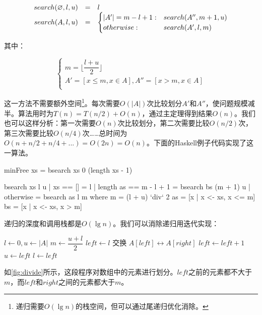 \documentclass[b5paper]{ctexart}
\begin{document}
\[
\begin{array}{rcl}
search(\varnothing, l, u) & = & l \\
search(A, l, u) & = & \begin{cases}
       |A'| = m - l + 1 : & search(A'', m+1, u) \\
       otherwise : & search(A',  l, m) \\
\end{cases}
\end{array}
\]

其中：

\[
\begin{cases}
m = \lfloor \dfrac{l + u}{2} \rfloor \\
A' = [x \leq m, x \in A], A'' = [x > m, x \in A] \\
\end{cases}
\]

这一方法不需要额外空间\footnote{递归需要$O(\lg n)$的栈空间，但可以通过尾递归优化消除。}。每次需要$O(|A|)$次比较划分$A'$和$A''$，使问题规模减半。算法用时为$T(n) = T(n/2) + O(n)$，通过主定理得到结果$O(n)$。我们也可以这样分析：第一次需要$O(n)$次比较划分，第二次需要比较$O(n/2)$次，第三次需要比较$O(n/4)$次……总时间为$O(n + n/2 + n/4 + ...) = O(2n) = O(n)$。下面的Haskell例子代码实现了这一算法。

\lstset{frame = single}
\begin{Haskell}
minFree xs = bsearch xs 0 (length xs - 1)

bsearch xs l u | xs == [] = l
               | length as == m - l + 1 = bsearch bs (m + 1) u
               | otherwise = bsearch as l m
    where
      m = (l + u) `div` 2
      as = [x | x <- xs, x <= m]
      bs = [x | x <- xs, x > m]
\end{Haskell}

递归的深度和调用栈都是$O(\lg n)$。我们可以消除递归用迭代实现：

\begin{algorithmic}[1]
  \State $l \gets 0, u \gets |A|$
    \State $m \gets \dfrac{u + l}{2}$
    \State $left \gets l$
        \State 交换 $A[left] \leftrightarrow A[right]$
        \State $left \gets left + 1$
      \EndIf
    \EndFor
      \State $u \gets left$
    \Else
      \State $l \gets left$
    \EndIf
  \EndWhile
\EndFunction
\end{algorithmic}

如\cref{fig:divide}所示，这段程序对数组中的元素进行划分。$left$之前的元素都不大于$m$，而$left$和$right$之间的元素都大于$m$。
\end{document}
